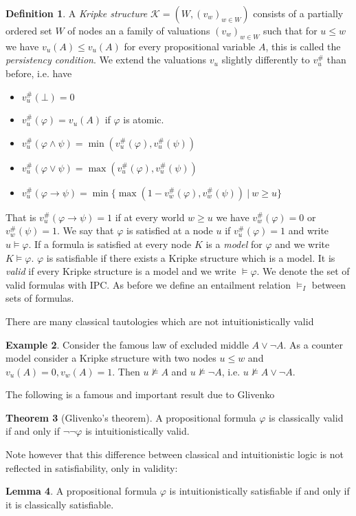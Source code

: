 \documentclass[a4paper,11pt]{report}
\theoremstyle{definition}
\newtheorem{theorem}{Theorem}[section]
\theoremstyle{definition}
\theoremstyle{definition}
\newtheorem{lemma}[theorem]{Lemma}
\theoremstyle{definition}
\theoremstyle{definition}
\newtheorem{definition}[theorem]{Definition}
\theoremstyle{definition}
\newtheorem{example}[theorem]{Example}
\theoremstyle{definition}
\begin{document}
	\begin{definition}
		A \textit{Kripke structure} $\mathcal K = (W, (v_w)_{w\in W})$ consists of a partially ordered set $W$ of nodes an a family of valuations $(v_w)_{w\in W}$ such that for $u\leq w$ we have $v_u(A)\leq v_u(A)$ for every propositional variable $A$, this is called the \textit{persistency condition}. We extend the valuations $v_u$ slightly differently to $v_u^\#$ than before, i.e. have
		\begin{itemize}
			\item $v_u^\#(\bot) = 0$
			\item $v_u^\#(\varphi) = v_u(A)$ if $\varphi$ is atomic.
			\item $v_u^\#(\varphi\wedge\psi) = \min(v_u^\#(\varphi), v_u^\#(\psi))$
			\item $v_u^\#(\varphi\vee\psi) = \max(v_u^\#(\varphi), v_u^\#(\psi))$
			\item $v_u^\#(\varphi\to \psi) = \min\{\max(1 - v_w^\#(\varphi), v_w^\#(\psi))\:|\:w\geq u\}$
		\end{itemize}
		That is $v_u^\#(\varphi\to \psi) = 1$ if at every world $w\geq u$ we have $v_w^\#(\varphi) = 0$ or $v_w^\#(\psi) = 1$. We say that $\varphi$ is satisfied at a node $u$ if $v_u^\#(\varphi) = 1$ and write $u\models\varphi$. If a formula is satisfied at every node $K$ is a \textit{model} for $\varphi$ and we write $K\models \varphi$. $\varphi$ is satisfiable if there exists a Kripke structure which is a model. It is \textit{valid} if every Kripke structure is a model and we write $\models \varphi$. We denote the set of valid formulas with IPC. As before we define an entailment relation $\models_I$ between sets of formulas.
	\end{definition}
	There are many classical tautologies which are not intuitionistically valid
	\begin{example}\label{LEMcounterexample}
		Consider the famous law of excluded middle $A\vee\neg A$. As a counter model consider a Kripke structure with two nodes $u\leq w$ and $v_u(A) = 0, v_w(A) = 1$. Then $u\not\models A$ and $u\not\models \neg A$, i.e. $u\not\models A\vee\neg A$. 
	\end{example}
	The following is a famous and important result due to Glivenko~\cite{glivenko1929}
	
	\begin{theorem}[Glivenko's theorem]
		A propositional formula $\varphi$ is classically valid if and only if $\neg\neg\varphi$ is intuitionistically valid.
	\end{theorem}
	\noindent Note however that this difference between classical and intuitionistic logic is not reflected in satisfiability, only in validity:
	\begin{lemma}\label{propsat}
		A propositional formula $\varphi$ is intuitionistically satisfiable if and only if it is classically satisfiable.
	\end{lemma}
\end{document}
